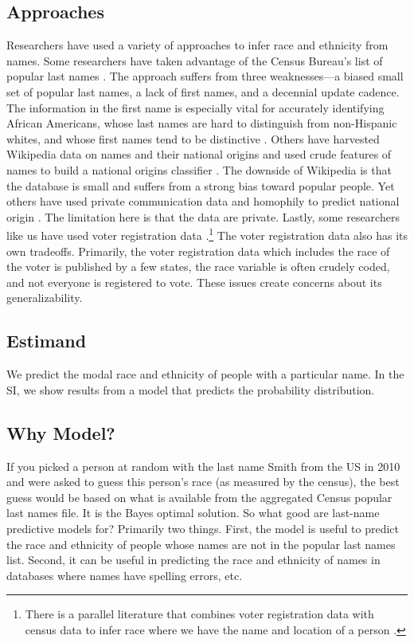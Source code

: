 \documentclass[12pt, letterpaper]{article}
\begin{document}
\subsection*{Approaches} Researchers have used a variety of approaches to infer race and ethnicity from names. Some researchers have taken advantage of the Census Bureau's list of popular last names \citep[see, e.g.,][]{fiscella2006use}. The approach suffers from three weaknesses---a biased small set of popular last names, a lack of first names, and a decennial update cadence. The information in the first name is especially vital for accurately identifying African Americans, whose last names are hard to distinguish from non-Hispanic whites, and whose first names tend to be distinctive \citep{bertrand2004emily}. Others have harvested Wikipedia data on names and their national origins and used crude features of names to build a national origins classifier \citep{ambekar2009name}. The downside of Wikipedia is that the database is small and suffers from a strong bias toward popular people. Yet others have used private communication data and homophily to predict national origin \citep{ye2017nationality}. The limitation here is that the data are private. Lastly, some researchers like us have used voter registration data \citep{sood2018predicting, parasurama2021racebert}.\footnote{There is a parallel literature that combines voter registration data with census data to infer race where we have the name and location of a person \citep[see for e.g.,]{imai2016improving, kotovadeep}.} The voter registration data also has its own tradeoffs. Primarily, the voter registration data which includes the race of the voter is published by a few states, the race variable is often crudely coded, and not everyone is registered to vote. These issues create concerns about its generalizability.

\subsection*{Estimand} We predict the modal race and ethnicity of people with a particular name. In the SI, we show results from a model that predicts the probability distribution. 

\subsection*{Why Model?} If you picked a person at random with the last name Smith from the US in 2010 and were asked to guess this person's race (as measured by the census), the best guess would be based on what is available from the aggregated Census popular last names file. It is the Bayes optimal solution. So what good are last-name predictive models for? Primarily two things. First, the model is useful to predict the race and ethnicity of people whose names are not in the popular last names list. Second, it can be useful in predicting the race and ethnicity of names in databases where names have spelling errors, etc.
\end{document}
